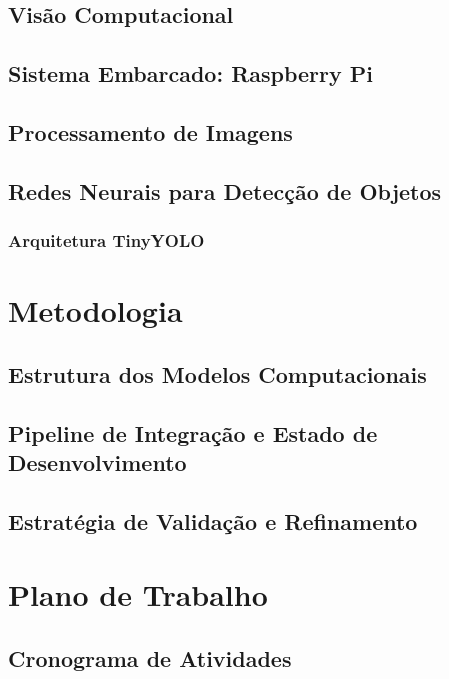 \documentclass{SBCbookchapter}
\begin{document}
\subsection{Visão Computacional}


\subsection{Sistema Embarcado: Raspberry Pi}


\subsection{Processamento de Imagens}


\subsection{Redes Neurais para Detecção de Objetos}


\subsubsection{Arquitetura TinyYOLO}


\section{Metodologia}

\subsection{Estrutura dos Modelos Computacionais}


\subsection{Pipeline de Integração e Estado de Desenvolvimento}


\subsection{Estratégia de Validação e Refinamento}



\section{Plano de Trabalho}


\subsection{Cronograma de Atividades}
\end{document}

